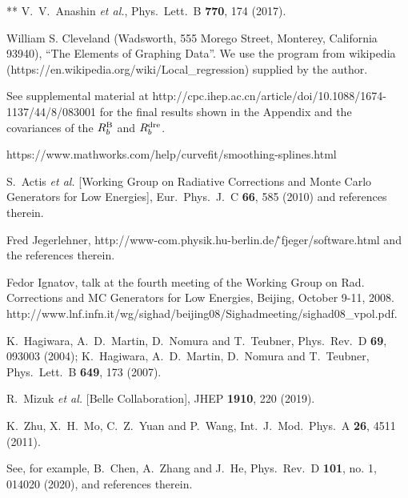 \documentclass[aps,showpacs,superscriptaddress,preprint,tightenlines]{revtex4}
\newcommand{\Rb}{R_b}
\newcommand{\RbB}{R_b^{\rm B}}
\begin{document}
\begin{thebibliography}{**}
  V.~V.~Anashin {\it et al.},
  Phys.\ Lett.\ B {\bf 770}, 174 (2017).

 William S. Cleveland (Wadsworth,
555 Morego Street, Monterey, California 93940), ``The Elements
of Graphing Data''. We use the program from wikipedia
(https://en.wikipedia.org/wiki/Local\_regression) supplied by the
author.

 See supplemental material at http://cpc.ihep.ac.cn/article/doi/10.1088/1674-1137/44/8/083001
for the final results shown in the Appendix
and the covariances of the $\RbB$ and $\Rb^{\rm dre}$.

https://www.mathworks.com/help/curvefit/smoothing-splines.html

  S.~Actis {\it et al.} [Working Group on Radiative Corrections and Monte Carlo Generators for Low Energies],
  Eur.\ Phys.\ J.\ C {\bf 66}, 585 (2010) and references therein.

 Fred Jegerlehner,
http://www-com.physik.hu-berlin.de/\~\,fjeger/software.html and
the references therein.

 Fedor Ignatov, talk at the fourth meeting
of the Working Group on Rad. Corrections and MC Generators for Low
Energies, Beijing, October 9-11, 2008.
http://www.lnf.infn.it/wg/sighad/beijing08/Sighadmeeting/sighad08\_vpol.pdf.

  K.~Hagiwara, A.~D.~Martin, D.~Nomura and T.~Teubner,
  Phys.\ Rev.\ D {\bf 69}, 093003 (2004);
  K.~Hagiwara, A.~D.~Martin, D.~Nomura and T.~Teubner,
  Phys.\ Lett.\ B {\bf 649}, 173 (2007).

  R.~Mizuk {\it et al.} [Belle Collaboration],
  JHEP {\bf 1910}, 220 (2019).

  K.~Zhu, X.~H.~Mo, C.~Z.~Yuan and P.~Wang,
  Int.\ J.\ Mod.\ Phys.\ A {\bf 26}, 4511 (2011).

  See, for example, B.~Chen, A.~Zhang and J.~He,
  Phys.\ Rev.\ D {\bf 101}, no. 1, 014020 (2020), and references therein.


\end{thebibliography}
\end{document}
